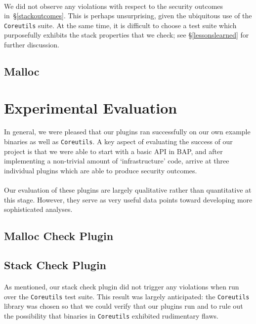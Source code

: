 \documentclass[letterpaper,11pt]{article}
\begin{document}
\paragraph{}
We did not observe any violations with respect to the security outcomes
in~\S\ref{stackoutcomes}. This is perhaps unsurprising, given the ubiquitous
use of the \texttt{Coreutils} suite. At the same time, it is difficult to
choose a test suite which purposefully exhibits the stack properties that we
check; see \S\ref{lessonslearned} for further discussion.

\subsection{Malloc}


\section{Experimental Evaluation}

\paragraph{}
In general, we were pleased that our plugins ran successfully on our own
example binaries as well as \texttt{Coreutils}. A key aspect of evaluating
the success of our project is that we were able to start with a basic API in
BAP, and after implementing a non-trivial amount of `infrastructure' code,
arrive at three individual plugins which are able to produce security outcomes.

\paragraph{}
Our evaluation of these plugins are largely qualitative rather than
quantitative at this stage. However, they serve as very useful data points
toward developing more sophisticated analyses.

\subsection{Malloc Check Plugin} 


\subsection{Stack Check Plugin}

\paragraph{}
As mentioned, our stack check plugin did not trigger any violations when run
over the \texttt{Coreutils} test suite. This result was largely anticipated:
the \texttt{Coreutils} library was chosen so that we could verify that our
plugins run and to rule out the possibility that binaries in \texttt{Coreutils}
exhibited rudimentary flaws. 
\end{document}
